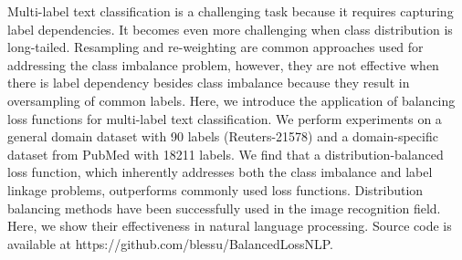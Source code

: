 Multi-label text classification is a challenging task because it requires capturing label dependencies. It becomes even more challenging when class distribution is long-tailed. Resampling and re-weighting are common approaches used for addressing the class imbalance problem, however, they are not effective when there is label dependency besides class imbalance because they result in oversampling of common labels. Here, we introduce the application of balancing loss functions for multi-label text classification. We perform experiments on a general domain dataset with 90 labels (Reuters-21578) and a domain-specific dataset from PubMed with 18211 labels. We find that a distribution-balanced loss function, which inherently addresses both the class imbalance and label linkage problems, outperforms commonly used loss functions. Distribution balancing methods have been successfully used in the image recognition field. Here, we show their effectiveness in natural language processing. Source code is available at https://github.com/blessu/BalancedLossNLP.
